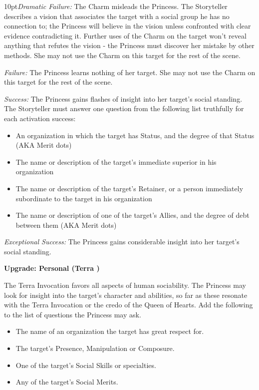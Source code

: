 \begin{myindentpar}{10pt}\emph{Dramatic Failure:} The Charm misleads the Princess. The Storyteller describes a vision that associates the target with a social group he has no connection to; the Princess will believe in the vision unless confronted with clear evidence contradicting it. Further uses of the Charm on the target won't reveal anything that refutes the vision - the Princess must discover her mistake by other methods. She may not use the Charm on this target for the rest of the scene.

\emph{Failure:} The Princess learns nothing of her target. She may not use the Charm on this target for the rest of the scene.

\emph{Success:} The Princess gains flashes of insight into her target's social standing. The Storyteller must answer one question from the following list truthfully for each activation success:

\begin{itemize}
\item An organization in which the target has Status, and the degree of that Status (AKA Merit dots)
\item The name or description of the target's immediate superior in his organization
\item The name or description of the target's Retainer, or a person immediately subordinate to the target in his organization
\item The name or description of one of the target's Allies, and the degree of debt between them (AKA Merit dots)
\end{itemize}


\emph{Exceptional Success:} The Princess gains considerable insight into her target's social standing.

\textbf{Upgrade: Personal (Terra \textbullet\textbullet)}

The Terra Invocation favors all aspects of human sociability. The Princess may look for insight into the target's character and abilities, so far as these resonate with the Terra Invocation or the credo of the Queen of Hearts. Add the following to the list of questions the Princess may ask.
\begin{itemize}
\item The name of an organization the target has great respect for. 
\item The target's Presence, Manipulation or Composure.
\item One of the target's Social Skills or specialties.
\item Any of the target's Social Merits.\end{itemize}\end{myindentpar}

